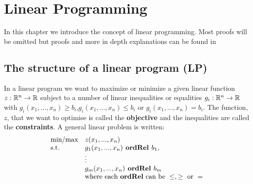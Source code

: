 \chapter{Linear Programming}
In this chapter we introduce the concept of linear programming. Most proofs will be omitted but proofs and more in depth explanations can be found in ~\cite{vanderbei2015linear}
\section{The structure of a linear program (LP)}
In a linear program we want to maximize or minimize a given linear function $z:\mathbb{R}^n \rightarrow \mathbb{R}$ subject to a number of linear inequalities or equalities $g_i:\mathbb{R}^n \rightarrow \mathbb{R}$ with $g_i(x_1,...,x_n)\geq b_i$,$g_i(x_1,...,x_n)\leq b_i$ or $g_i(x_1,...,x_n)= b_i$. The function, $z$, that we want to optimise is called the \textbf{objective} and the inequalities are called the \textbf{constraints}. A general linear problem is written:
\begin{align}\label{lpform}
\begin{array}{ll@{}ll}
\text{min/max} &z(x_1,...,x_n)&\\
\text{s.t.} &g_1(x_1,...,x_n) \textbf{ ordRel } b_1,&\\
&\vdots&\\
&g_m(x_1,...,x_n) \textbf{ ordRel } b_m&\\
&\text{where each \textbf{ordRel} can be }\leq,\geq \text{ or } =&
\end{array}
\end{align}

